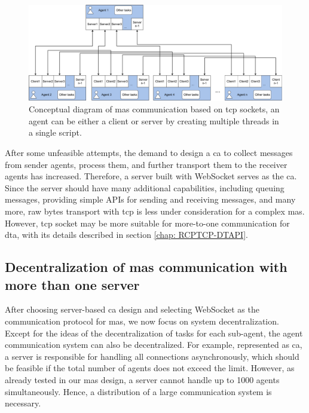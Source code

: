 \begin{figure}[htb]
    \includegraphics[width=\textwidth]{figures/threads_MAS.pdf}
    \centering
    \caption{Conceptual diagram of \gls{mas} communication based on 
    \gls{tcp} sockets, an agent can be either a client or server by creating 
    multiple threads in a single script. \label{fig: threadMASConceptual}}
\end{figure}



After some unfeasible attempts, the demand to design a \gls{ca} to collect 
messages from sender agents, process them, and further transport them to the 
receiver agents has increased. Therefore, a server built with WebSocket serves 
as the \gls{ca}. Since the server should have many additional 
capabilities, including queuing messages, providing simple APIs for sending 
and receiving messages, and many more, raw bytes transport with \gls{tcp} is 
less under consideration for a complex \gls{mas}. However, \gls{tcp} socket 
may be more suitable for more-to-one communication for \gls{dta}, 
with its details described in section \ref{chap: RCPTCP-DTAPI}.  



\subsection{Decentralization of \gls{mas} communication with more than one server}
After choosing server-based \gls{ca} design and selecting WebSocket as the 
communication protocol for \gls{mas}, we now focus on system decentralization.  
Except for the ideas of the decentralization of tasks for each sub-agent, the agent 
communication system can also be decentralized. For example, represented as \gls{ca}, 
a server is responsible for handling all connections asynchronously, which should be 
feasible if the total number of agents does not exceed the limit. However, as already 
tested in our \gls{mas} design, a server cannot handle up to 1000 agents simultaneously. 
Hence, a distribution of a large communication system is necessary. 


